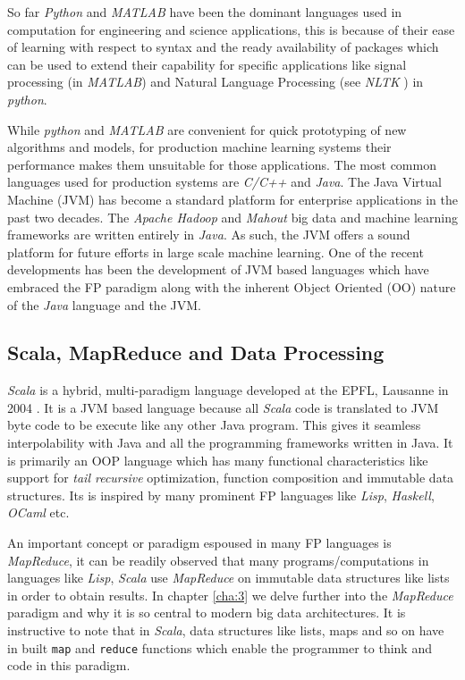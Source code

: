 So far \textit{Python} and \textit{MATLAB} have been the dominant languages used in computation for engineering and science applications, this is because of their ease of learning with respect to syntax and the ready availability of packages which can be used to extend their capability for specific applications like signal processing (in \textit{MATLAB}) and Natural Language Processing (see \textit{NLTK} \cite{NLTK} ) in \textit{python}.

While \textit{python} and \textit{MATLAB} are convenient for quick prototyping of new algorithms and models, for production machine learning systems their performance makes them unsuitable for those applications. The most common languages used for production systems are \textit{C/C++} and \textit{Java}. The Java Virtual Machine (JVM) has become a standard platform for enterprise applications in the past two decades. The \textit{Apache Hadoop} and \textit{Mahout} big data and machine learning frameworks are written entirely in \textit{Java}. As such, the JVM offers a sound platform for future efforts in large scale machine learning. One of the recent developments has been the development of JVM based languages which have embraced the FP paradigm along with the inherent Object Oriented (OO) nature of the \textit{Java} language and the JVM.

\subsection*{Scala, MapReduce and Data Processing}

\textit{Scala} is a hybrid, multi-paradigm language developed at the EPFL, Lausanne in 2004 \cite{scala-overview-tech-report}. It is a JVM based language because all \textit{Scala} code is translated to JVM byte code to be execute like any other Java program. This gives it seamless interpolability with Java and all the programming frameworks written in Java. It is primarily an OOP language which has many functional characteristics like support for \textit{tail recursive} optimization, function composition and immutable data structures. Its is inspired by many prominent FP languages like \textit{Lisp}, \textit{Haskell}, \textit{OCaml} etc.

An important concept or paradigm espoused in many FP languages is \textit{MapReduce}, it can be readily observed that many programs/computations in languages like \textit{Lisp}, \textit{Scala} use \textit{MapReduce} on immutable data structures like lists in order to obtain results. In chapter \ref{cha:3} we delve further into the \textit{MapReduce} paradigm and why it is so central to modern big data architectures. It is instructive to note that in \textit{Scala}, data structures like lists, maps and so on have in built \texttt{map} and \texttt{reduce} functions which enable the programmer to think and code in this paradigm.

